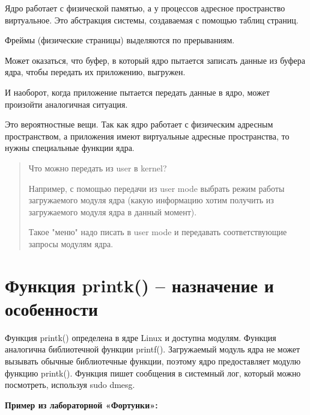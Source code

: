 Ядро работает с физической памятью, а у процессов адресное пространство виртуальное. Это абстракция системы, создаваемая с помощью таблиц страниц.

Фреймы (физические страницы) выделяются по прерываниям.

Может оказаться, что буфер, в который ядро пытается записать данные из буфера ядра, чтобы передать их приложению, выгружен.

И наоборот, когда приложение пытается передать данные в ядро, может произойти аналогичная ситуация.

Это вероятностные вещи. Так как ядро работает с физическим адресным пространством, а приложения имеют виртуальные адресные пространства, то нужны специальные функции ядра.

\begin{quote}
Что можно передать из user в kernel?

Например, с помощью передачи из user mode выбрать режим работы загружаемого модуля ядра (какую информацию хотим получить из загружаемого модуля ядра в данный момент).

Такое "меню" надо писать в user mode и передавать соответствующие запросы модулям ядра.
\end{quote}

\section{Функция printk() – назначение и особенности}
Функция printk() определена в ядре Linux и доступна модулям. Функция аналогична библиотечной функции printf(). Загружаемый модуль ядра не может вызывать обычные библиотечные функции, поэтому ядро предоставляет модулю функцию printk(). Функция пишет сообщения в системный лог, который можно посмотреть, используя sudo dmesg.

\textbf{Пример из лабораторной «Фортунки»:}

